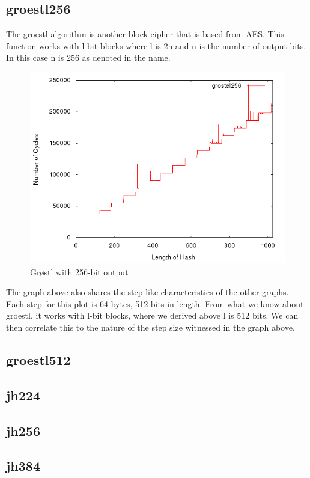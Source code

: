 \documentclass[10pt,a4paper]{article}
\begin{document}
\subsection{groestl256}
The groestl algorithm is another block cipher that is based from AES. This function works with l-bit blocks where l is 2n and n is the number of output bits. In this case n is 256 as denoted in the name. 
    \begin{figure}[H]
        \begin{center}
            \includegraphics[scale=0.5]{images/grostel256.png} 
            \caption{Grøstl with 256-bit output}
        \end{center}
    \end{figure}
The graph above also shares the step like characteristics of the other graphs. Each step for this plot is 64 bytes, 512 bits in length. From what we know about groestl, it works with l-bit blocks, where we derived above l is 512 bits. We can then correlate this to the nature of the step size witnessed in the graph above.


\subsection{groestl512}
\subsection{jh224}
\subsection{jh256}
\subsection{jh384}
\end{document}

